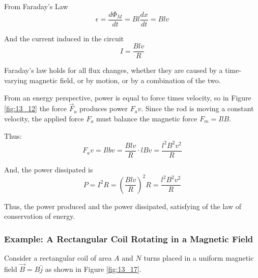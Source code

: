 \documentclass[14pt]{memoir}
\begin{document}
From Faraday's Law
\begin{equation}
\epsilon = \frac{d \Phi_M}{dt} = B l \frac{dx}{dt} = B l v
\end{equation}

And the current induced in the circuit
\begin{equation}
I = \frac{B l v}{R}
\end{equation}

Faraday's law holds for all flux changes, whether they are caused by a time-varying magnetic field, or by motion, or by a combination of the two.

From an energy perspective, power is equal to force times velocity, so in Figure \ref{fig:13_12} the force $\vec{F}_a$ produces power $F_a v$. Since the rod is moving a constant velocity, the applied force $F_a$ must balance the magnetic force $F_m = I l B$. 

Thus:
\begin{equation}
F_a v = I l b v = \frac{B l v}{R} \cdot l B v = \frac{l^2 B^2 v^2 }{R}
\end{equation}

And, the power dissipated is 
\begin{equation}
P = I^2 R = (\frac{B l v}{R})^2 R = \frac{l^2 B^2 v^2 }{R}
\end{equation}

Thus, the power produced and the power dissipated, satisfying of the law of conservation of energy. 

\subsubsection{Example: A Rectangular Coil Rotating in a Magnetic Field}

Consider a rectangular coil of area $A$ and $N$ turns placed in a uniform magnetic field $\vec{B} = B \hat{j}$ as shown in Figure \ref{fig:13_17}.
\end{document}
